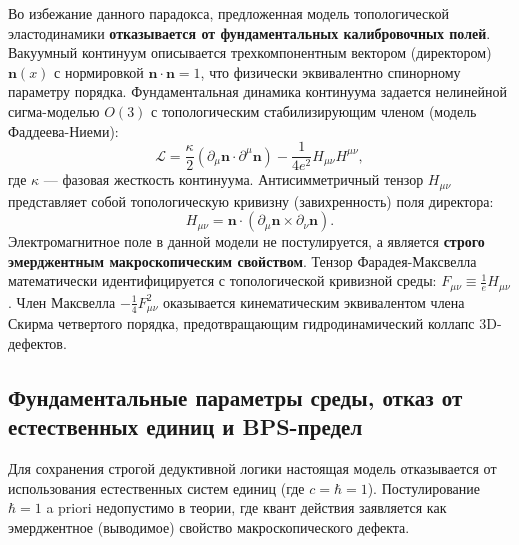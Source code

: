 \documentclass[11pt,a4paper]{article}
\begin{document}
	Во избежание данного парадокса, предложенная модель топологической эластодинамики \textbf{отказывается от фундаментальных калибровочных полей}. Вакуумный континуум описывается трехкомпонентным вектором (директором) $\mathbf{n}(x)$ с нормировкой $\mathbf{n} \cdot \mathbf{n} = 1$, что физически эквивалентно спинорному параметру порядка. 
	Фундаментальная динамика континуума задается нелинейной сигма-моделью $O(3)$ с топологическим стабилизирующим членом (модель Фаддеева-Ниеми):
	\begin{equation}
		\mathcal{L} = \frac{\kappa}{2} (\partial_\mu \mathbf{n} \cdot \partial^\mu \mathbf{n}) - \frac{1}{4e^2} H_{\mu\nu} H^{\mu\nu},
	\end{equation}
	где $\kappa$ — фазовая жесткость континуума. Антисимметричный тензор $H_{\mu\nu}$ представляет собой топологическую кривизну (завихренность) поля директора:
	\begin{equation}
		H_{\mu\nu} = \mathbf{n} \cdot (\partial_\mu \mathbf{n} \times \partial_\nu \mathbf{n}).
	\end{equation}
	Электромагнитное поле в данной модели не постулируется, а является \textbf{строго эмерджентным макроскопическим свойством}. Тензор Фарадея-Максвелла математически идентифицируется с топологической кривизной среды: $F_{\mu\nu} \equiv \frac{1}{e} H_{\mu\nu}$. Член Максвелла $-\frac{1}{4}F_{\mu\nu}^2$ оказывается кинематическим эквивалентом члена Скирма четвертого порядка, предотвращающим гидродинамический коллапс 3D-дефектов.
	
	\subsection{Фундаментальные параметры среды, отказ от естественных единиц и BPS-предел}
	Для сохранения строгой дедуктивной логики настоящая модель отказывается от использования естественных систем единиц (где $c = \hbar = 1$). Постулирование $\hbar=1$ a priori недопустимо в теории, где квант действия заявляется как эмерджентное (выводимое) свойство макроскопического дефекта.
	
\end{document}
